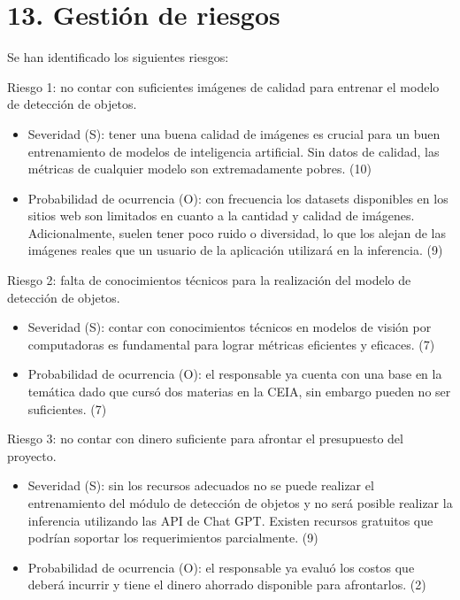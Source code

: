 \documentclass[
11pt, %
]{charter}
\begin{document}
\section{13. Gestión de riesgos}
\label{sec:riesgos}
Se han identificado los siguientes riesgos: 

Riesgo 1: no contar con suficientes imágenes de calidad para entrenar el modelo de detección de objetos.
\begin{itemize}
\item Severidad (S): tener una buena calidad de imágenes es crucial para un buen entrenamiento de modelos de inteligencia artificial. Sin datos de calidad, las métricas de cualquier modelo son extremadamente pobres. (10)
\item Probabilidad de ocurrencia (O): con frecuencia los datasets disponibles en los sitios web son limitados en cuanto a la cantidad y calidad de imágenes. Adicionalmente, suelen tener poco ruido o diversidad, lo que los alejan de las imágenes reales que un usuario de la aplicación utilizará en la inferencia. (9)
\end{itemize}

Riesgo 2: falta de conocimientos técnicos para la realización del modelo de detección de objetos.
\begin{itemize}
\item Severidad (S): contar con conocimientos técnicos en modelos de visión por computadoras es fundamental para lograr métricas eficientes y eficaces. (7)
\item Probabilidad de ocurrencia (O):  el responsable ya cuenta con una base en la temática dado que cursó dos materias en la CEIA, sin embargo pueden no ser suficientes. (7)
\end{itemize}

Riesgo 3: no contar con dinero suficiente para afrontar el presupuesto del proyecto.
\begin{itemize}
\item Severidad (S): sin los recursos adecuados no se puede realizar el entrenamiento del módulo de detección de objetos y no será posible realizar la inferencia utilizando las API de Chat GPT. Existen recursos gratuitos que podrían soportar los requerimientos parcialmente. (9)
\item Probabilidad de ocurrencia (O): el responsable ya evaluó los costos que deberá incurrir y tiene el dinero ahorrado disponible para afrontarlos. (2)
\end{itemize}
\end{document}
